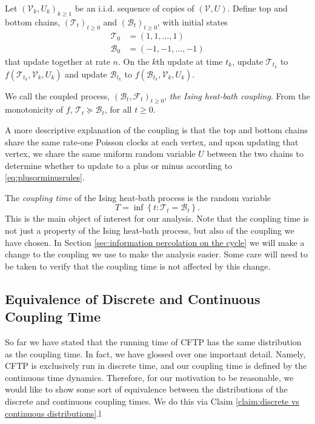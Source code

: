 	Let $(\mathscr{V}_k, U_k)_{k \geq 1}$ be an i.i.d. sequence of copies of $(\mathscr{V}, U)$. Define top and bottom chains, $(\mathscr{T}_t)_{t\geq0}$ and $(\mathscr{B}_t)_{t\geq0}$, with initial states
	\begin{align}
		\mathscr{T}_0 &= (1, 1, \dots, 1)\\
		\mathscr{B}_0 &= (-1, -1, \dots, -1)
	\end{align}
	that update together at rate $n$. On the $k$th update at time $t_k$, update $\mathscr{T}_{t_k}$ to $f(\mathscr{T}_{t_k}, \mathscr{V}_k, U_k)$ and update $\mathscr{B}_{t_k}$ to $f(\mathscr{B}_{t_k}, \mathscr{V}_k, U_k)$.

	We call the coupled process, $(\mathscr{B}_t, \mathscr{F}_t)_{t\geq0}$, \emph{the Ising heat-bath coupling}. From the monotonicity of $f$, $\mathscr{T}_t \succeq \mathscr{B}_t$, for all $t \geq 0$.

	A more descriptive explanation of the coupling is that the top and bottom chains share the same rate-one Poisson clocks at each vertex, and upon updating that vertex, we share the same uniform random variable $U$ between the two chains to determine whether to update to a plus or minus according to \eqref{eq:plusorminusrules}.

	The \emph{coupling time} of the Ising heat-bath process is the random variable
	\begin{equation}
		T = \inf \left\{t : \mathscr{T}_t = \mathscr{B}_t \right\}.	
	\end{equation}
	This is the main object of interest for our analysis. Note that the coupling time is not just a property of the Ising heat-bath process, but also of the coupling we have chosen. In Section \ref{sec:information percolation on the cycle} we will make a change to the coupling we use to make the analysis easier. Some care will need to be taken to verify that the coupling time is not affected by this change.

	\subsection{Equivalence of Discrete and Continuous Coupling Time}
	So far we have stated that the running time of CFTP has the same distribution as the coupling time. In fact, we have glossed over one important detail. Namely, CFTP is exclusively run in discrete time, and our coupling time is defined by the continuous time dynamics. Therefore, for our motivation to be reasonable, we would like to show some sort of equivalence between the distributions of the discrete and continuous coupling times. We do this via Claim \ref{claim:discrete vs continuous distributions}.l

